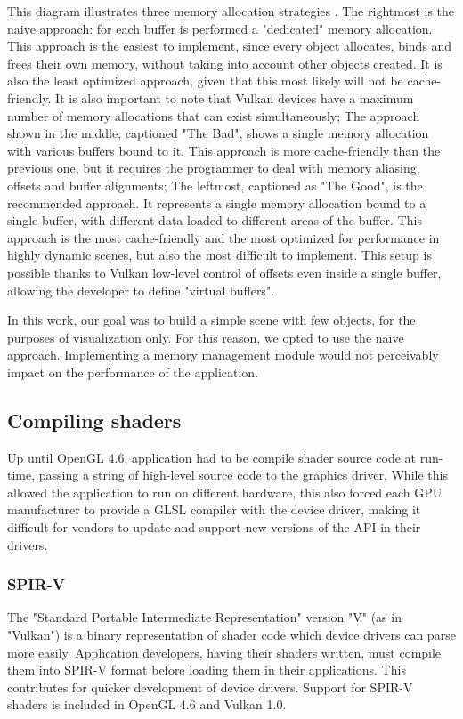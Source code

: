 This diagram illustrates three memory allocation strategies \cite{vulkan_mem_mgmt}.
The rightmost is the naive approach: for each buffer is performed a "dedicated" memory allocation. This approach is the easiest to implement, since every object allocates, binds and frees their own memory, without taking into account other objects created. It is also the least optimized approach, given that this most likely will not be cache-friendly. It is also important to note that Vulkan devices have a maximum number of memory allocations that can exist simultaneously;
The approach shown in the middle, captioned "The Bad", shows a single memory allocation with various buffers bound to it. This approach is more cache-friendly than the previous one, but it requires the programmer to deal with memory aliasing, offsets and buffer alignments;
The leftmost, captioned as "The Good", is the recommended approach. It represents a single memory allocation bound to a single buffer, with different data loaded to different areas of the buffer. This approach is the most cache-friendly and the most optimized for performance in highly dynamic scenes, but also the most difficult to implement. This setup is possible thanks to Vulkan low-level control of offsets even inside a single buffer, allowing the developer to define "virtual buffers".

In this work, our goal was to build a simple scene with few objects, for the purposes of visualization only. For this reason, we opted to use the naive approach. Implementing a memory management module would not perceivably impact on the performance of the application.

\subsection{Compiling shaders}
Up until OpenGL 4.6, application had to be compile shader source code at run-time, passing a string of high-level source code to the graphics driver. While this allowed the application to run on different hardware, this also forced each GPU manufacturer to provide a GLSL compiler with the device driver, making it difficult for vendors to update and support new versions of the API in their drivers.

\subsubsection{SPIR-V}
The "Standard Portable Intermediate Representation" version "V" (as in "Vulkan") is a binary representation of shader code which device drivers can parse more easily. Application developers, having their shaders written, must compile them into SPIR-V format before loading them in their applications. This contributes for quicker development of device drivers. Support for SPIR-V shaders is included in OpenGL 4.6 and Vulkan 1.0.
